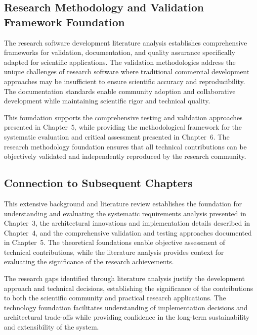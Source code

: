 \documentclass[11pt,a4paper]{report}
\begin{document}
\subsection{Research Methodology and Validation Framework Foundation}

The research software development literature analysis establishes comprehensive frameworks for validation, documentation, and quality assurance specifically adapted for scientific applications. The validation methodologies address the unique challenges of research software where traditional commercial development approaches may be insufficient to ensure scientific accuracy and reproducibility. The documentation standards enable community adoption and collaborative development while maintaining scientific rigor and technical quality.

This foundation supports the comprehensive testing and validation approaches presented in Chapter~5, while providing the methodological framework for the systematic evaluation and critical assessment presented in Chapter~6. The research methodology foundation ensures that all technical contributions can be objectively validated and independently reproduced by the research community.

\subsection{Connection to Subsequent Chapters}

This extensive background and literature review establishes the foundation for understanding and evaluating the systematic requirements analysis presented in Chapter~3, the architectural innovations and implementation details described in Chapter~4, and the comprehensive validation and testing approaches documented in Chapter~5. The theoretical foundations enable objective assessment of technical contributions, while the literature analysis provides context for evaluating the significance of the research achievements.

The research gaps identified through literature analysis justify the development approach and technical decisions, establishing the significance of the contributions to both the scientific community and practical research applications. The technology foundation facilitates understanding of implementation decisions and architectural trade-offs while providing confidence in the long-term sustainability and extensibility of the system.
\end{document}
